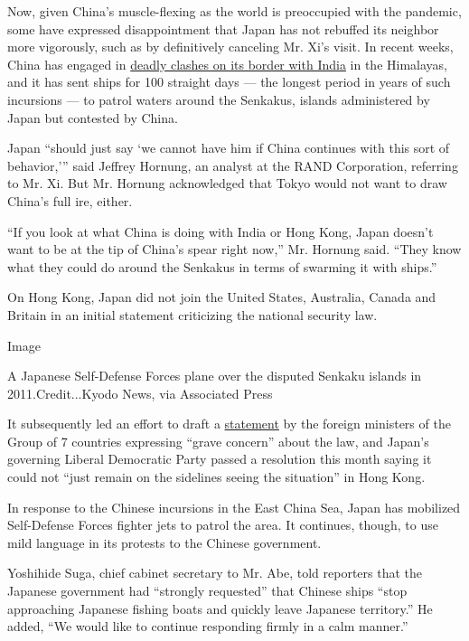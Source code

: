Now, given China's muscle-flexing as the world is preoccupied with the
pandemic, some have expressed disappointment that Japan has not rebuffed
its neighbor more vigorously, such as by definitively canceling Mr. Xi's
visit. In recent weeks, China has engaged in
\href{https://www.nytimes3xbfgragh.onion/2020/06/16/world/asia/indian-china-border-clash.html}{deadly
clashes on its border with India} in the Himalayas, and it has sent
ships for 100 straight days --- the longest period in years of such
incursions --- to patrol waters around the Senkakus, islands
administered by Japan but contested by China.

Japan ``should just say `we cannot have him if China continues with this
sort of behavior,''' said Jeffrey Hornung, an analyst at the RAND
Corporation, referring to Mr. Xi. But Mr. Hornung acknowledged that
Tokyo would not want to draw China's full ire, either.

``If you look at what China is doing with India or Hong Kong, Japan
doesn't want to be at the tip of China's spear right now,'' Mr. Hornung
said. ``They know what they could do around the Senkakus in terms of
swarming it with ships.''

On Hong Kong, Japan did not join the United States, Australia, Canada
and Britain in an initial statement criticizing the national security
law.

Image

A Japanese Self-Defense Forces plane over the disputed Senkaku islands
in 2011.Credit...Kyodo News, via Associated Press

It subsequently led an effort to draft a
\href{https://www.mofa.go.jp/press/release/press4e_002844.html}{statement}
by the foreign ministers of the Group of 7 countries expressing ``grave
concern'' about the law, and Japan's governing Liberal Democratic Party
passed a resolution this month saying it could not ``just remain on the
sidelines seeing the situation'' in Hong Kong.

In response to the Chinese incursions in the East China Sea, Japan has
mobilized Self-Defense Forces fighter jets to patrol the area. It
continues, though, to use mild language in its protests to the Chinese
government.

Yoshihide Suga, chief cabinet secretary to Mr. Abe, told reporters that
the Japanese government had ``strongly requested'' that Chinese ships
``stop approaching Japanese fishing boats and quickly leave Japanese
territory.'' He added, ``We would like to continue responding firmly in
a calm manner.''

